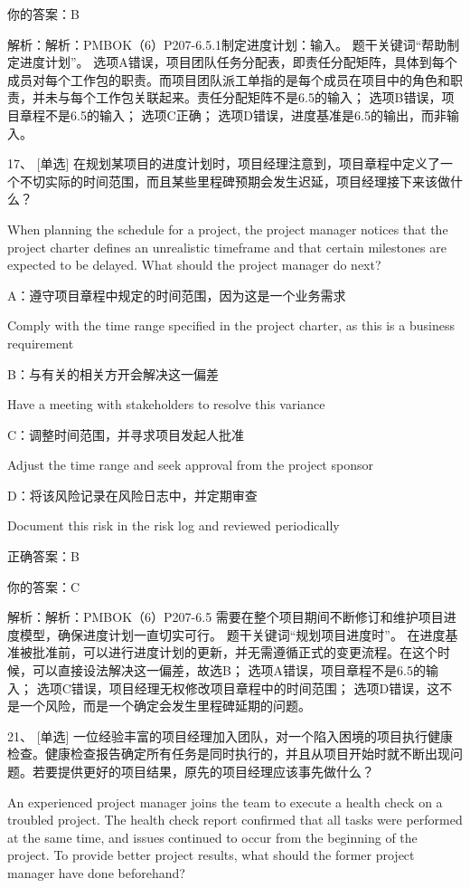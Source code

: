 你的答案：B

解析：解析：PMBOK（6）P207-6.5.1制定进度计划：输入。 题干关键词“帮助制定进度计划”。 选项A错误，项目团队任务分配表，即责任分配矩阵，具体到每个成员对每个工作包的职责。而项目团队派工单指的是每个成员在项目中的角色和职责，并未与每个工作包关联起来。责任分配矩阵不是6.5的输入； 选项B错误，项目章程不是6.5的输入； 选项C正确； 选项D错误，进度基准是6.5的输出，而非输入。



17、 [单选] 在规划某项目的进度计划时，项目经理注意到，项目章程中定义了一个不切实际的时间范围，而且某些里程碑预期会发生迟延，项目经理接下来该做什么？

When planning the schedule for a project, the project manager notices that the project charter defines an unrealistic timeframe and that certain milestones are expected to be delayed. What should the project manager do next?

A：遵守项目章程中规定的时间范围，因为这是一个业务需求

Comply with the time range specified in the project charter, as this is a business requirement

B：与有关的相关方开会解决这一偏差

Have a meeting with stakeholders to resolve this variance

C：调整时间范围，并寻求项目发起人批准

Adjust the time range and seek approval from the project sponsor

D：将该风险记录在风险日志中，并定期审查

Document this risk in the risk log and reviewed periodically

正确答案：B

你的答案：C

解析：解析：PMBOK（6）P207-6.5 需要在整个项目期间不断修订和维护项目进度模型，确保进度计划一直切实可行。 题干关键词“规划项目进度时”。 在进度基准被批准前，可以进行进度计划的更新，并无需遵循正式的变更流程。在这个时候，可以直接设法解决这一偏差，故选B； 选项A错误，项目章程不是6.5的输入； 选项C错误，项目经理无权修改项目章程中的时间范围； 选项D错误，这不是一个风险，而是一个确定会发生里程碑延期的问题。



21、 [单选] 一位经验丰富的项目经理加入团队，对一个陷入困境的项目执行健康检查。健康检查报告确定所有任务是同时执行的，并且从项目开始时就不断出现问题。若要提供更好的项目结果，原先的项目经理应该事先做什么？

An experienced project manager joins the team to execute a health check on a troubled project. The health check report confirmed that all tasks were performed at the same time, and issues continued to occur from the beginning of the project. To provide better project results, what should the former project manager have done beforehand?

